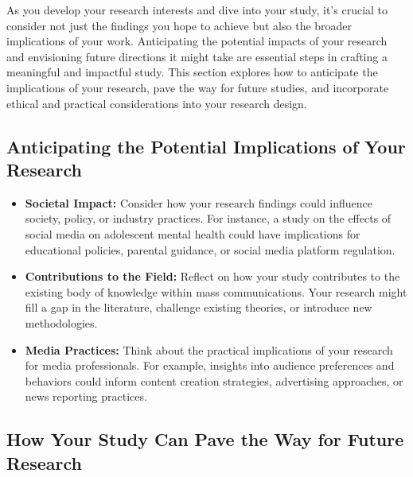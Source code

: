 \documentclass[
]{book}
\begin{document}
As you develop your research interests and dive into your study, it's crucial to consider not just the findings you hope to achieve but also the broader implications of your work. Anticipating the potential impacts of your research and envisioning future directions it might take are essential steps in crafting a meaningful and impactful study. This section explores how to anticipate the implications of your research, pave the way for future studies, and incorporate ethical and practical considerations into your research design.

\hypertarget{anticipating-the-potential-implications-of-your-research}{%
\subsection*{Anticipating the Potential Implications of Your Research}\label{anticipating-the-potential-implications-of-your-research}}

\begin{itemize}
\item
  \textbf{Societal Impact:} Consider how your research findings could influence society, policy, or industry practices. For instance, a study on the effects of social media on adolescent mental health could have implications for educational policies, parental guidance, or social media platform regulation.
\item
  \textbf{Contributions to the Field:} Reflect on how your study contributes to the existing body of knowledge within mass communications. Your research might fill a gap in the literature, challenge existing theories, or introduce new methodologies.
\item
  \textbf{Media Practices:} Think about the practical implications of your research for media professionals. For example, insights into audience preferences and behaviors could inform content creation strategies, advertising approaches, or news reporting practices.
\end{itemize}

\hypertarget{how-your-study-can-pave-the-way-for-future-research}{%
\subsection*{How Your Study Can Pave the Way for Future Research}\label{how-your-study-can-pave-the-way-for-future-research}}
\end{document}
